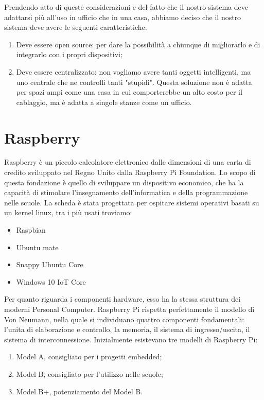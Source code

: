 Prendendo atto di queste considerazioni e del fatto che il nostro sistema deve adattarsi più all'uso in ufficio che in una casa, abbiamo deciso che il nostro sistema deve avere le seguenti caratteristiche:
\begin{enumerate}
\item Deve essere open source: per dare la possibilità a chiunque di migliorarlo e di integrarlo con i propri dispositivi;
\item Deve essere centralizzato: non vogliamo avere tanti oggetti intelligenti,
ma uno centrale che ne controlli tanti "stupidi". Questa soluzione non è adatta per spazi ampi come una casa in cui comporterebbe un alto costo per il cablaggio, ma è adatta a singole stanze come un ufficio. 
\end{enumerate} 

\section{Raspberry}
Raspberry è un piccolo calcolatore elettronico dalle dimensioni di una
carta di credito sviluppato nel Regno Unito dalla Raspberry Pi
Foundation. Lo scopo di questa fondazione è quello di sviluppare un
dispositivo economico, che ha la capacità di stimolare l'insegnamento
dell'informatica e della programmazione nelle scuole. La scheda è stata
progettata per ospitare sistemi operativi basati su un kernel linux, tra i
più usati troviamo:
\begin{itemize}
\item Raspbian
\item Ubuntu mate
\item Snappy Ubuntu Core
\item Windows 10 IoT Core
\end{itemize}
Per quanto riguarda i componenti hardware, esso ha la stessa struttura
dei moderni Personal Computer. Raspberry Pi rispetta perfettamente il
modello di Von Neumann, nella quale si individuano quattro componenti
fondamentali: l'unita di elaborazione e controllo, la memoria, il sistema
di ingresso/uscita, il sistema di interconnessione. Inizialmente esistevano tre modelli di Raspberry Pi:
\begin{enumerate}
\item Model A, consigliato per i progetti embedded;
\item Model B, consigliato per l'utilizzo nelle scuole;
\item Model B+, potenziamento del Model B.
\end{enumerate}

